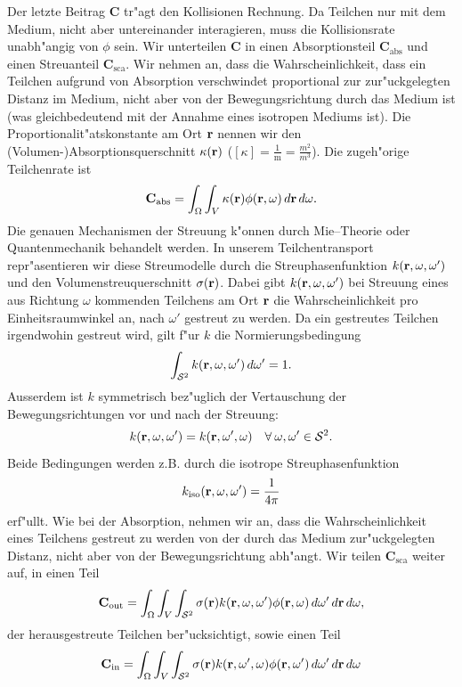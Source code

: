 	Der letzte Beitrag $\mathbf{C}$ tr"agt den Kollisionen Rechnung. Da Teilchen nur mit dem Medium, nicht aber untereinander interagieren, muss die Kollisionsrate unabh"angig von $\phi$ sein. Wir unterteilen $\mathbf{C}$ in einen Absorptionsteil $\mathbf{C}_\text{abs}$ und einen Streuanteil $\mathbf{C}_\text{sca}$. Wir nehmen an, dass die Wahrscheinlichkeit, dass ein Teilchen aufgrund von Absorption verschwindet proportional zur zur"uckgelegten Distanz im Medium, nicht aber von der Bewegungsrichtung durch das Medium ist (was gleichbedeutend mit der Annahme eines isotropen Mediums ist). Die Proportionalit"atskonstante am Ort $\mathbf{r}$ nennen wir den (Volumen-)Absorptionsquerschnitt $\kappa(\mathbf{r})$ ($[\kappa]=\frac{1}{\text{m}}=\frac{m^2}{m^3}$). Die zugeh"orige Teilchenrate ist
	$$\mathbf{C}_\text{abs}=\int_\Omega \int_V \kappa(\mathbf{r})\phi(\mathbf{r},\omega)\,d\mathbf{r}\,d\omega.$$
	Die genauen Mechanismen der Streuung k"onnen durch Mie--Theorie oder Quantenmechanik behandelt werden. In unserem Teilchentransport repr"asentieren wir diese Streumodelle durch die Streuphasenfunktion $k(\mathbf{r},\omega,\omega')$ und den Volumenstreuquerschnitt $\sigma(\mathbf{r})$. Dabei gibt $k(\mathbf{r},\omega,\omega')$ bei Streuung eines aus Richtung $\omega$ kommenden Teilchens am Ort $\mathbf{r}$ die Wahrscheinlichkeit pro Einheitsraumwinkel an, nach $\omega'$ gestreut zu werden. Da ein gestreutes Teilchen irgendwohin gestreut wird, gilt f"ur $k$ die Normierungsbedingung
	\begin{equation}\label{eq:k_norm_req}
	  \int_{\mathcal{S}^2} k(\mathbf{r},\omega,\omega')\,d\omega'=1.
	\end{equation}
	Ausserdem ist $k$ symmetrisch bez"uglich der Vertauschung der Bewegungsrichtungen vor und nach der Streuung:
	$$k(\mathbf{r},\omega,\omega')=k(\mathbf{r},\omega',\omega)\quad \forall\:\omega,\omega'\in\mathcal{S}^2.$$
	Beide Bedingungen werden z.B. durch die isotrope Streuphasenfunktion $$k_\text{iso}(\mathbf{r},\omega,\omega')=\frac{1}{4\pi}$$ erf"ullt.
	Wie bei der Absorption, nehmen wir an, dass die Wahrscheinlichkeit eines Teilchens gestreut zu werden von der durch das Medium zur"uckgelegten Distanz, nicht aber von der Bewegungsrichtung abh"angt. Wir teilen $\mathbf{C}_\text{sca}$ weiter auf, in einen Teil
	$$\mathbf{C}_\text{out}=\int_\Omega \int_V \int_{\mathcal{S}^2} \sigma{(\mathbf{r})}k(\mathbf{r},\omega,\omega')\phi(\mathbf{r},\omega)\,d\omega'\,d\mathbf{r}\,d\omega,$$
	der herausgestreute Teilchen ber"ucksichtigt, sowie einen Teil
	$$\mathbf{C}_\text{in}=\int_\Omega \int_V \int_{\mathcal{S}^2} \sigma{(\mathbf{r})}k(\mathbf{r},\omega',\omega)\phi(\mathbf{r},\omega')\,d\omega'\,d\mathbf{r}\,d\omega$$
